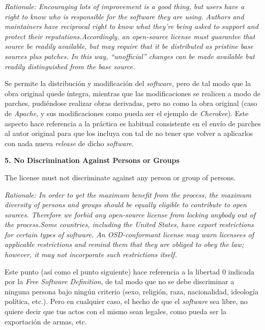 \textit{Rationale: Encouraging lots of improvement is a good thing, but users
have a right to know who is responsible for the software they are using. Authors
and maintainers have reciprocal right to know what they're being asked to
support and protect their reputations.\newline Accordingly, an open-source
license must guarantee that source be readily available, but may require that it
be distributed as pristine base sources plus patches. In this way,
``unofficial'' changes can be made available but readily distinguished from the
base source.}\newline

Se permite la distribución y modificación del \textit{software}, pero de tal
modo que la obra original quede íntegra, mientras que las modificaciones se
realicen a modo de parches, pudiéndose realizar obras derivadas, pero no como la
obra original (caso de \textit{Apache}, y sus modificaciones como pueda ser el
ejemplo de \textit{Cherokee}). Este aspecto hace referencia a la práctica es
habitual consistente en el envío de parches al autor original para que los
incluya con tal de no tener que volver a aplicarlos con nada nueva
\textit{release} de dicho \textit{software}.\newline

{\bf 5. No Discrimination Against Persons or Groups

The license must not discriminate against any person or group of persons.}

\textit{Rationale: In order to get the maximum benefit from the process, the
maximum diversity of persons and groups should be equally eligible to contribute
to open sources. Therefore we forbid any open-source license from locking
anybody out of the process.\newline Some countries, including the United States,
have export restrictions for certain types of software. An OSD-conformant
license may warn licensees of applicable restrictions and remind them that they
are obliged to obey the law; however, it may not incorporate such restrictions
itself.}\newline

Este punto (así como el punto siguiente) hace referencia a la libertad 0
indicada por la \textit{Free Software Definition}, de tal modo que no se debe
discriminar a ninguna persona bajo ningún criterio (sexo, religión, raza,
nacionalidad, ideología política, etc.). Pero en cualquier caso, el hecho de que
el \textit{software} sea libre, no quiere decir que tus actos con el mismo sean
legales, como pueda ser la exportación de armas, etc.\newline

